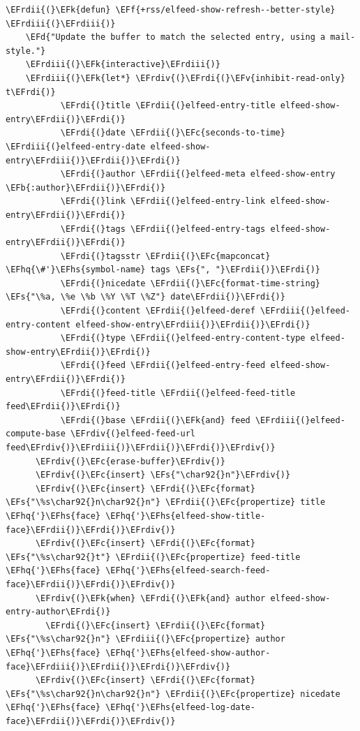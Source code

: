 \documentclass{scrartcl}
\newcommand{\EFk}[1]{\textcolor{EFk}{#1}} %
\newcommand{\EFd}[1]{\textcolor{EFd}{\textit{#1}}} %
\newcommand{\EFs}[1]{\textcolor{EFs}{#1}} %
\newcommand{\EFb}[1]{\textcolor{EFb}{#1}} %
\newcommand{\EFc}[1]{\textcolor{EFc}{#1}} %
\newcommand{\EFv}[1]{\textcolor{EFv}{#1}} %
\newcommand{\EFf}[1]{\textcolor{EFf}{#1}} %
\newcommand{\EFhq}[1]{\textcolor{EFhq}{#1}} %
\newcommand{\EFhs}[1]{\textcolor{EFhs}{#1}} %
\newcommand{\EFrdi}[1]{\textcolor{EFrdi}{#1}} %
\newcommand{\EFrdii}[1]{\textcolor{EFrdii}{#1}} %
\newcommand{\EFrdiii}[1]{\textcolor{EFrdiii}{#1}} %
\newcommand{\EFrdiv}[1]{\textcolor{EFrdiv}{#1}} %
\begin{document}
\begin{Code}
\begin{Verbatim}[]
  \EFrdii{(}\EFk{defun} \EFf{+rss/elfeed-show-refresh--better-style} \EFrdiii{(}\EFrdiii{)}
    \EFd{"Update the buffer to match the selected entry, using a mail-style."}
    \EFrdiii{(}\EFk{interactive}\EFrdiii{)}
    \EFrdiii{(}\EFk{let*} \EFrdiv{(}\EFrdi{(}\EFv{inhibit-read-only} t\EFrdi{)}
           \EFrdi{(}title \EFrdii{(}elfeed-entry-title elfeed-show-entry\EFrdii{)}\EFrdi{)}
           \EFrdi{(}date \EFrdii{(}\EFc{seconds-to-time} \EFrdiii{(}elfeed-entry-date elfeed-show-entry\EFrdiii{)}\EFrdii{)}\EFrdi{)}
           \EFrdi{(}author \EFrdii{(}elfeed-meta elfeed-show-entry \EFb{:author}\EFrdii{)}\EFrdi{)}
           \EFrdi{(}link \EFrdii{(}elfeed-entry-link elfeed-show-entry\EFrdii{)}\EFrdi{)}
           \EFrdi{(}tags \EFrdii{(}elfeed-entry-tags elfeed-show-entry\EFrdii{)}\EFrdi{)}
           \EFrdi{(}tagsstr \EFrdii{(}\EFc{mapconcat} \EFhq{\#'}\EFhs{symbol-name} tags \EFs{", "}\EFrdii{)}\EFrdi{)}
           \EFrdi{(}nicedate \EFrdii{(}\EFc{format-time-string} \EFs{"\%a, \%e \%b \%Y \%T \%Z"} date\EFrdii{)}\EFrdi{)}
           \EFrdi{(}content \EFrdii{(}elfeed-deref \EFrdiii{(}elfeed-entry-content elfeed-show-entry\EFrdiii{)}\EFrdii{)}\EFrdi{)}
           \EFrdi{(}type \EFrdii{(}elfeed-entry-content-type elfeed-show-entry\EFrdii{)}\EFrdi{)}
           \EFrdi{(}feed \EFrdii{(}elfeed-entry-feed elfeed-show-entry\EFrdii{)}\EFrdi{)}
           \EFrdi{(}feed-title \EFrdii{(}elfeed-feed-title feed\EFrdii{)}\EFrdi{)}
           \EFrdi{(}base \EFrdii{(}\EFk{and} feed \EFrdiii{(}elfeed-compute-base \EFrdiv{(}elfeed-feed-url feed\EFrdiv{)}\EFrdiii{)}\EFrdii{)}\EFrdi{)}\EFrdiv{)}
      \EFrdiv{(}\EFc{erase-buffer}\EFrdiv{)}
      \EFrdiv{(}\EFc{insert} \EFs{"\char92{}n"}\EFrdiv{)}
      \EFrdiv{(}\EFc{insert} \EFrdi{(}\EFc{format} \EFs{"\%s\char92{}n\char92{}n"} \EFrdii{(}\EFc{propertize} title \EFhq{'}\EFhs{face} \EFhq{'}\EFhs{elfeed-show-title-face}\EFrdii{)}\EFrdi{)}\EFrdiv{)}
      \EFrdiv{(}\EFc{insert} \EFrdi{(}\EFc{format} \EFs{"\%s\char92{}t"} \EFrdii{(}\EFc{propertize} feed-title \EFhq{'}\EFhs{face} \EFhq{'}\EFhs{elfeed-search-feed-face}\EFrdii{)}\EFrdi{)}\EFrdiv{)}
      \EFrdiv{(}\EFk{when} \EFrdi{(}\EFk{and} author elfeed-show-entry-author\EFrdi{)}
        \EFrdi{(}\EFc{insert} \EFrdii{(}\EFc{format} \EFs{"\%s\char92{}n"} \EFrdiii{(}\EFc{propertize} author \EFhq{'}\EFhs{face} \EFhq{'}\EFhs{elfeed-show-author-face}\EFrdiii{)}\EFrdii{)}\EFrdi{)}\EFrdiv{)}
      \EFrdiv{(}\EFc{insert} \EFrdi{(}\EFc{format} \EFs{"\%s\char92{}n\char92{}n"} \EFrdii{(}\EFc{propertize} nicedate \EFhq{'}\EFhs{face} \EFhq{'}\EFhs{elfeed-log-date-face}\EFrdii{)}\EFrdi{)}\EFrdiv{)}

\end{Verbatim}
\end{Code}
\end{document}
